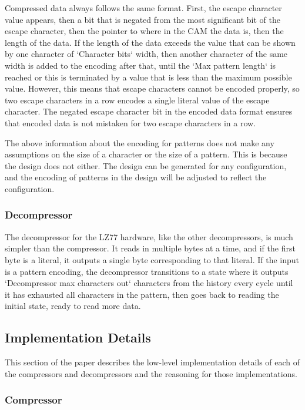 \documentclass[doublespace,nopageskip]{VTthesis}
\begin{document}
Compressed data always follows the same format. First, the escape character value appears, then a bit that is negated from the most significant bit of the escape character, then the pointer to where in the CAM the data is, then the length of the data. If the length of the data exceeds the value that can be shown by one character of `Character bits` width, then another character of the same width is added to the encoding after that, until the `Max pattern length` is reached or this is terminated by a value that is less than the maximum possible value. However, this means that escape characters cannot be encoded properly, so two escape characters in a row encodes a single literal value of the escape character. The negated escape character bit in the encoded data format ensures that encoded data is not mistaken for two escape characters in a row.

The above information about the encoding for patterns does not make any assumptions on the size of a character or the size of a pattern. This is because the design does not either. The design can be generated for any configuration, and the encoding of patterns in the design will be adjusted to reflect the configuration.

\subsubsection{Decompressor}\label{sss:lz77_decompressor_design}
The decompressor for the LZ77 hardware, like the other decompressors, is much simpler than the compressor. It reads in multiple bytes at a time, and if the first byte is a literal, it outputs a single byte corresponding to that literal. If the input is a pattern encoding, the decompressor transitions to a state where it outputs `Decompressor max characters out` characters from the history every cycle until it has exhausted all characters in the pattern, then goes back to reading the initial state, ready to read more data.

\subsection{Implementation Details}\label{se:lz77_implementation_details}
This section of the paper describes the low-level implementation details of each of the compressors and decompressors and the reasoning for those implementations.

\subsubsection{Compressor}\label{sss:lz77_compressor_implementation}
\end{document}
